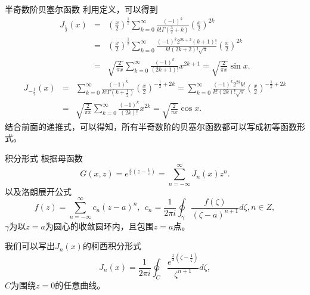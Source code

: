 \documentclass[11pt]{beamer}
\begin{document}
\begin{frame}{半奇数阶贝塞尔函数}
利用定义，可以得到
\begin{eqnarray}
J_{\frac{1}{2}}(x) &=& (\frac{x}{2})^{\frac{1}{2}} \sum^\infty_{k=0} \frac{ (-1)^k }{ k! \Gamma(\frac{3}{2}+k) } (\frac{x}{2})^{2k}
 \nonumber\\
 &=& (\frac{x}{2})^{\frac{1}{2}} 
 \sum^\infty_{k=0} \frac{ (-1)^k　2^{2k+2} (k+1)! }{ k! (2k+2)! \sqrt{\pi} } (\frac{x}{2})^{2k}
 \nonumber\\
 &=& \sqrt{\frac{2}{\pi x}} \sum^\infty_{k=0} \frac{(-1)^k}{(2k+1)!}x^{2k+1} = \sqrt{\frac{2}{\pi x}} \sin x.
\end{eqnarray}
\begin{eqnarray}
J_{-\frac{1}{2}}(x) &=& \sum^\infty_{k=0} \frac{(-1)^k}{k! \Gamma(k+\frac{1}{2})} (\frac{x}{2})^{-\frac{1}{2}+2k}
 = \sum^\infty_{k=0} \frac{(-1)^k 2^{2k} k! }{k! (2k)! \sqrt{\pi} } (\frac{x}{2})^{-\frac{1}{2}+2k}
 \nonumber\\
 &=& \sqrt{\frac{2}{\pi x}} \sum^\infty_{k=0} \frac{(-1)^k}{(2k)!}x^{2k} = \sqrt{\frac{2}{\pi x}}\cos x.
\end{eqnarray}
结合前面的递推式，可以得知，所有半奇数阶的贝塞尔函数都可以写成初等函数形式。
\end{frame}


\begin{frame}{积分形式}
根据母函数
\begin{equation}
G(x,z) = e^{\frac{x}{2}(z-\frac{1}{z})} = \sum^\infty_{n=-\infty} J_n(x) z^n.
\end{equation}
以及洛朗展开公式
\begin{equation}
f(z) = \sum^\infty_{n=-\infty} c_n (z-a)^n, ~~
c_n = \frac{1}{2\pi i} \oint_\gamma \frac{f(\zeta)}{(\zeta-a)^{n+1}} d\zeta, n\in Z,
\end{equation}
$\gamma$为以$z=a$为圆心的收敛圆环内，且包围$z=a$点。

我们可以写出$J_n(x)$的柯西积分形式
\begin{equation}
J_n(x) = \frac{1}{2\pi i} \oint_C \frac{e^{\frac{x}{2}(\zeta-\frac{1}{\zeta})}}{\zeta^{n+1}} d\zeta,
\end{equation}
$C$为围绕$z=0$的任意曲线。

\end{frame}
\end{document}
